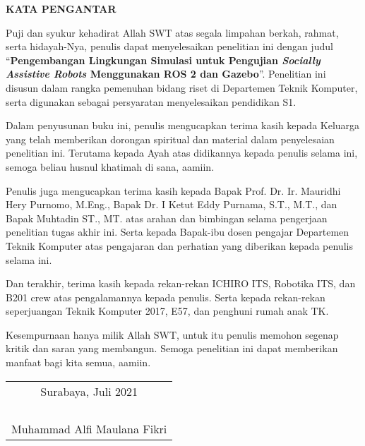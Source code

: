 \begin{center}
  \Large
  \textbf{KATA PENGANTAR}
\end{center}

\vspace{2ex}

Puji dan syukur kehadirat Allah SWT atas segala limpahan berkah, rahmat, serta hidayah-Nya, penulis  dapat menyelesaikan penelitian ini dengan judul
``\textbf{Pengembangan Lingkungan Simulasi untuk Pengujian \emph{Socially Assistive Robots} Menggunakan ROS 2 dan Gazebo}''.
Penelitian ini disusun dalam rangka pemenuhan bidang riset di Departemen Teknik Komputer,
  serta digunakan sebagai persyaratan menyelesaikan pendidikan S1.

Dalam penyusunan buku ini,
  penulis mengucapkan terima kasih kepada Keluarga yang telah memberikan dorongan spiritual dan material dalam penyelesaian penelitian ini.
Terutama kepada Ayah atas didikannya kepada penulis selama ini,
  semoga beliau husnul khatimah di sana, aamiin.

Penulis juga mengucapkan terima kasih kepada Bapak Prof. Dr. Ir. Mauridhi Hery Purnomo, M.Eng.,
  Bapak Dr. I Ketut Eddy Purnama, S.T., M.T.,
  dan Bapak Muhtadin ST., MT. atas arahan dan bimbingan selama pengerjaan penelitian tugas akhir ini.
Serta kepada Bapak-ibu dosen pengajar Departemen Teknik Komputer atas pengajaran dan perhatian yang diberikan kepada penulis selama ini.

Dan terakhir,
  terima kasih kepada rekan-rekan ICHIRO ITS, Robotika ITS, dan B201 crew atas pengalamannya kepada penulis.
Serta kepada rekan-rekan seperjuangan Teknik Komputer 2017, E57, dan penghuni rumah anak TK.

Kesempurnaan hanya milik Allah SWT, untuk itu penulis memohon segenap kritik dan saran yang  membangun.
Semoga penelitian ini dapat memberikan manfaat bagi kita semua, aamiin.

\begin{flushright}
  \begin{tabular}[b]{c}
    Surabaya, Juli 2021\\
    \\
    \\
    \\
    \\
    Muhammad Alfi Maulana Fikri
  \end{tabular}
\end{flushright}
